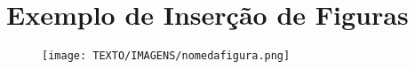 \chapter{Exemplo de Inserção de Figuras}
\label{cap-Figuras}


\begin{figure}[h]
\centering
\texttt{[image: TEXTO/IMAGENS/nomedafigura.png]}
\caption{}
\fonte{}
\end{figure}